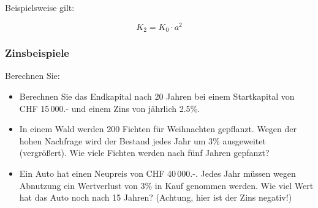 \begin{center}\end{center}

Beispielsweise gilt:

$$K_2 = K_0 \cdot{} a^2$$


\newpage

\subsubsection{Zinsbeispiele}

Berechnen Sie:

\begin{itemize}
  \item Berechnen Sie das Endkapital nach 20 Jahren bei einem
  Startkapital von CHF 15\,000.- und einem Zins von jährlich
  2.5\%.\\%

\item In einem Wald werden 200 Fichten für Weihnachten
  gepflanzt. Wegen der hohen Nachfrage wird der Bestand jedes Jahr um
  3\% ausgeweitet (vergrößert).
  Wie viele Fichten werden nach fünf Jahren gepfanzt?


\item Ein Auto hat einen Neupreis von CHF 40\,000.-. Jedes Jahr müssen wegen Abnutzung ein Wertverlust von 3\% in Kauf
  genommen werden. Wie viel Wert hat das Auto noch nach 15 Jahren? (Achtung, hier ist der Zins negativ!)

\end{itemize}
\newpage



